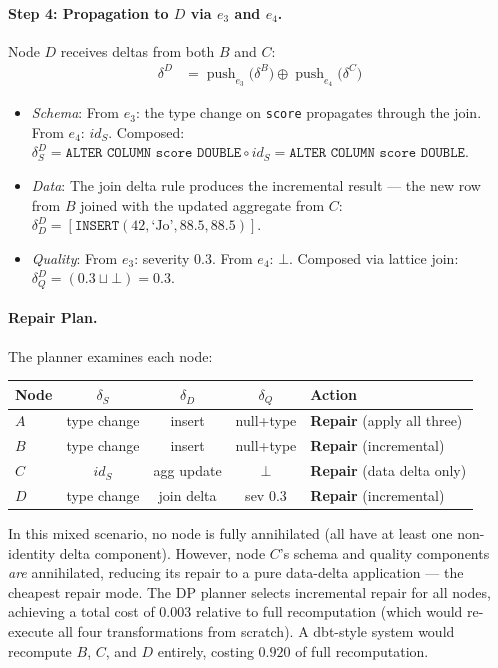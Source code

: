 \documentclass[sigplan,screen,nonacm]{acmart}
\newcommand{\compose}{\mathbin{\circ}}
\newcommand{\push}{\operatorname{push}}
\begin{document}
\paragraph{Step 4: Propagation to $D$ via $e_3$ and $e_4$.}
Node $D$ receives deltas from both $B$ and $C$:
\begin{align*}
\delta^D &= \push_{e_3}\bigl(\delta^B\bigr) \oplus \push_{e_4}\bigl(\delta^C\bigr)
\end{align*}
\begin{itemize}
\item \emph{Schema}: From $e_3$: the type change on \texttt{score}
  propagates through the join. From $e_4$: $\mathit{id}_S$.  Composed:
  $\delta_S^D = \texttt{ALTER COLUMN score DOUBLE} \compose \mathit{id}_S
  = \texttt{ALTER COLUMN score DOUBLE}$.
\item \emph{Data}: The join delta rule produces the incremental result ---
  the new row from $B$ joined with the updated aggregate from $C$:
  $\delta_D^D = [\texttt{INSERT}(42,\text{`Jo'},88.5,88.5)]$.
\item \emph{Quality}: From $e_3$: severity 0.3.  From $e_4$: $\bot$.
  Composed via lattice join: $\delta_Q^D = (0.3 \sqcup \bot) = 0.3$.
\end{itemize}

\paragraph{Repair Plan.}
The planner examines each node:
\begin{center}\small
\begin{tabular}{@{}lcccl@{}}
\toprule
\textbf{Node} & $\delta_S$ & $\delta_D$ & $\delta_Q$ & \textbf{Action} \\
\midrule
$A$ & type change & insert & null+type & \textbf{Repair} (apply all three) \\
$B$ & type change & insert & null+type & \textbf{Repair} (incremental) \\
$C$ & $\mathit{id}_S$ & agg update & $\bot$ & \textbf{Repair} (data delta only) \\
$D$ & type change & join delta & sev 0.3 & \textbf{Repair} (incremental) \\
\bottomrule
\end{tabular}
\end{center}

In this mixed scenario, no node is fully annihilated (all have at least one
non-identity delta component).  However, node $C$'s schema and quality
components \emph{are} annihilated, reducing its repair to a pure data-delta
application --- the cheapest repair mode.  The DP planner selects incremental
repair for all nodes, achieving a total cost of $0.003$ relative to full
recomputation (which would re-execute all four transformations from scratch).
A dbt-style system would recompute $B$, $C$, and $D$ entirely, costing
$0.920$ of full recomputation.
\end{document}
